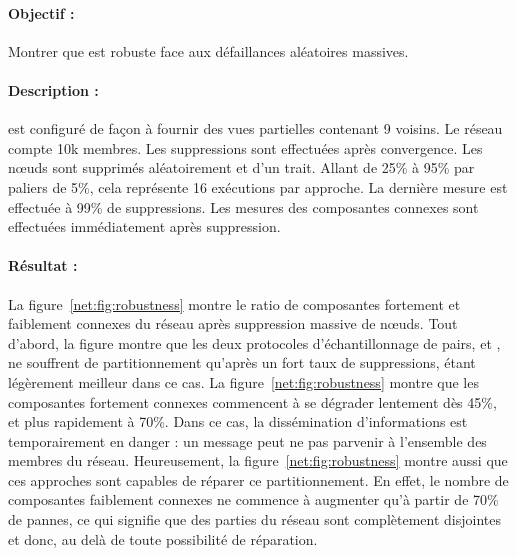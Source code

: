 \paragraph{Objectif :} Montrer que \SPRAY est robuste face aux défaillances
aléatoires massives.

\paragraph{Description :} \CYCLON est configuré de façon à fournir des vues
partielles contenant 9 voisins. Le réseau compte 10k membres. Les suppressions
sont effectuées après convergence. Les nœuds sont supprimés aléatoirement et
d'un trait. Allant de 25\% à 95\% par paliers de 5\%, cela représente 16
exécutions par approche. La dernière mesure est effectuée à 99\% de
suppressions. Les mesures des composantes connexes sont effectuées immédiatement
après suppression.

\paragraph{Résultat :} La figure~\ref{net:fig:robustness} montre le ratio de
composantes fortement et faiblement connexes du réseau après suppression massive
de nœuds. Tout d'abord, la figure montre que les deux protocoles
d'échantillonnage de pairs, \SPRAY et \CYCLON, ne souffrent de partitionnement
qu'après un fort taux de suppressions, \CYCLON étant légèrement meilleur dans ce
cas. La figure~\ref{net:fig:robustness} montre que les composantes fortement
connexes commencent à se dégrader lentement dès 45\%, et plus rapidement à
70\%. Dans ce cas, la dissémination d'informations est temporairement en danger
: un message peut ne pas parvenir à l'ensemble des membres du
réseau. Heureusement, la figure~\ref{net:fig:robustness} montre aussi que ces
approches sont capables de réparer ce partitionnement. En effet, le nombre de
composantes faiblement connexes ne commence à augmenter qu'à partir de 70\% de
pannes, ce qui signifie que des parties du réseau sont complètement disjointes
et donc, au delà de toute possibilité de réparation.

